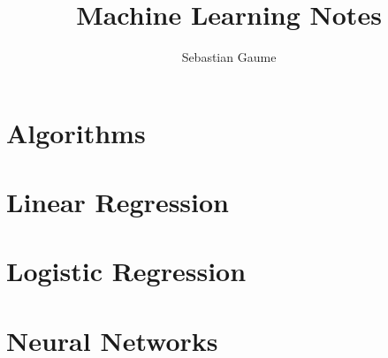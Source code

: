 \documentclass{report}
\title{Machine Learning Notes}
\author{Sebastian Gaume}
\begin{document}
\maketitle
\tableofcontents

\chapter{Algorithms}\label{chpt:algorithms}



\chapter{Linear Regression}



\chapter{Logistic Regression}



\chapter{Neural Networks}


\end{document}
